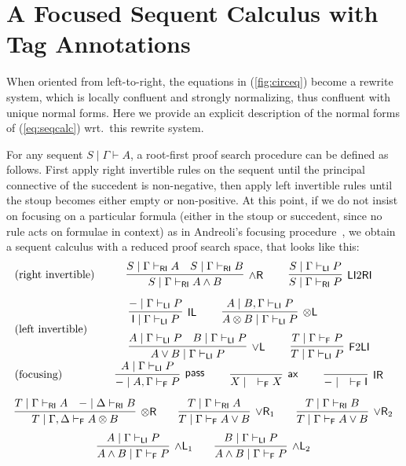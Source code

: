 \documentclass[submission,copyright,creativecommons]{eptcs}
\theoremstyle{definition}
\newcommand{\tl}{\otimes \mathsf{L}}
\newcommand{\tr}{\otimes \mathsf{R}}
\newcommand{\pass}{\mathsf{pass}}
\newcommand{\unitl}{\mathsf{IL}}
\newcommand{\unitr}{\mathsf{IR}}
\newcommand{\andlone}{\land \mathsf{L}_{1}}
\newcommand{\andltwo}{\land \mathsf{L}_{2}}
\newcommand{\andr}{\land \mathsf{R}}
\newcommand{\orl}{\lor \mathsf{L}}
\newcommand{\orrone}{\lor \mathsf{R}_{1}}
\newcommand{\orrtwo}{\lor \mathsf{R}_{2}}
\newcommand{\ax}{\mathsf{ax}}
\newcommand{\ot}{\otimes}
\newcommand{\I}{\mathsf{I}}
\newcommand{\RI}{\mathsf{RI}}
\newcommand{\LI}{\mathsf{LI}}
\newcommand{\F}{\mathsf{F}}
\newcommand{\proofbox}[1]{\begin{tabular}{l} #1 \end{tabular}}
\begin{document}
\section{A Focused Sequent Calculus with Tag Annotations}\label{sec:focusing}
When oriented from left-to-right, the equations in (\ref{fig:circeq}) become a  rewrite system, which is locally confluent and strongly normalizing, thus confluent with unique normal forms. Here we provide an explicit description of the normal forms of (\ref{eq:seqcalc})  wrt.~this rewrite system.

For any sequent $S \mid \Gamma \vdash A$, a root-first proof search procedure can be defined as follows. First apply right invertible rules on the sequent until the principal connective of the succedent is non-negative, then apply left invertible rules until the stoup becomes either empty or non-positive. At this point, if we do not insist on focusing on a particular formula (either in the stoup or succedent, since no rule acts on formulae in context) as in Andreoli's focusing procedure~\cite{andreoli:logic:1992}, we obtain a sequent calculus with a reduced proof search space, that looks like this:
\begin{equation}\label{eq:naive:focus}
  \begin{array}{lc}
    \text{(right invertible)} &
    \proofbox{
      \infer[\andr]{S \mid \Gamma \vdash_{\RI} A \land B}{
        S \mid \Gamma \vdash_{\RI} A
        &
        S \mid \Gamma \vdash_{\RI} B
      }
    \qquad
    \infer[\LI 2 \RI]{S \mid \Gamma \vdash_{\RI} P}{S \mid \Gamma \vdash_{\LI} P}
    }
    \\[15pt]
    \text{(left invertible)} &
    \proofbox{
      \infer[\unitl]{\I \mid \Gamma \vdash_{\LI} P}{{-} \mid \Gamma \vdash_{\LI} P}
    \qquad
    \infer[\tl]{A \ot B \mid \Gamma \vdash_{\LI} P}{A \mid B , \Gamma \vdash_{\LI} P}
    \\[6pt]
    \infer[\orl]{A \lor B \mid \Gamma \vdash_\LI P}{
      A \mid \Gamma \vdash_\LI P
      &
      B \mid \Gamma \vdash_\LI P
    }
    \qquad
    \infer[\F 2 \LI]{T \mid \Gamma \vdash_{\LI} P}{T \mid \Gamma \vdash_{\F} P}
    }
    \\[15pt]
    \text{(focusing)} &
    \proofbox{
    \infer[\pass]{{-} \mid A , \Gamma \vdash_{\F} P }{
        A \mid \Gamma \vdash_{\LI} P
    }
    \qquad
    \infer[\ax]{X \mid \quad \vdash_{\F} X}{}
    \qquad
    \infer[\unitr]{{-} \mid \quad \vdash_{\F} \I}{}
    }
    \\[15pt]
    \multicolumn{2}{c}{
    \infer[\tr]{T \mid \Gamma , \Delta \vdash_{\F} A \ot B}{
      T \mid \Gamma \vdash_{\RI} A
      &
      {-} \mid \Delta \vdash_{\RI} B
    }
    \qquad
    \infer[\orrone]{T \mid \Gamma \vdash_{\F} A \lor B}{
      T \mid \Gamma \vdash_{\RI} A
    }
    \qquad
    \infer[\orrtwo]{T \mid \Gamma \vdash_{\F} A \lor B}{
      T \mid \Gamma \vdash_{\RI} B
    }
    }
    \\[6pt]
    \multicolumn{2}{c}{
    \infer[\andlone]{A \land B \mid \Gamma \vdash_{\F} P}{A \mid \Gamma \vdash_{\LI} P}
    \qquad
    \infer[\andltwo]{A \land B \mid \Gamma \vdash_{\F} P}{B \mid \Gamma \vdash_{\LI} P}
    }
  \end{array}
\end{equation}
\end{document}
